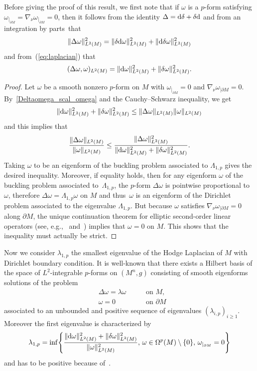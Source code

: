 \documentclass[pdftex]{sigma}
\numberwithin{equation}{section}
\theoremstyle{definition}
\begin{document}
Before giving the proof of this result, we first note that if $\omega$ is a $p$-form satisfying $\omega_{|_{\partial M}}=\nabla_\nu \omega_{|_{\partial M}}=0$, then it follows from the identity $\Delta={\rm d}\delta+\delta {\rm d}$ and from an integration by parts~that
\[%
\|\Delta \omega \|^2_{L^2(M)} = \|\delta {\rm d}\omega \|^2_{L^2( M)}+\|{\rm d}\delta\omega \|^2_{L^2(M)}
\]
and from~(\ref{eq:laplacian}) that
\begin{equation}\label{Deltaomega_scal_omega}
(\Delta \omega,\omega)_{L^2( M)} = \|{\rm d}\omega \|^2_{L^2( M)}+\|\delta\omega \|^2_{L^2(M)}.
\end{equation}

\begin{proof} Let $\omega$ be a smooth nonzero $p$-form on $M$ with $\omega_{|_{\partial M}}=0$ and $\nabla_\nu\omega_{|\partial M}=0$. By~\eqref{Deltaomega_scal_omega} and the Cauchy--Schwarz inequality, we get
\[
\|{\rm d}\omega \|^2_{L^2( M)}+\|\delta\omega \|^2_{L^2( M)}\leq\| \Delta \omega\|_{L^2( M)} \| \omega\|_{L^2( M)}
\]
and this implies that
\[
\frac{\| \Delta \omega\|_{L^2( M)}}{\|\omega\|_{L^2(M)}}\leq\frac{\| \Delta \omega\|_{L^2( M)}^2}{\|{\rm d}\omega \|^2_{L^2( M)}+\|\delta\omega \|^2_{L^2( M)}}.
\]
Taking $\omega$ to be an eigenform of the buckling problem associated to $\Lambda_{1,p}$ gives the desired inequality. Moreover, if equality holds, then for any eigenform $\omega$ of the buckling problem associated to~$\Lambda_{1,p}$, the $p$-form $\Delta\omega$ is pointwise proportional to $\omega$, therefore $\Delta\omega=\Lambda_{1,p}\omega$ on $M$ and thus~$\omega$ is an eigenform of the Dirichlet problem associated to the eigenvalue $\Lambda_{1,p}$.
But because $\omega$ satisfies $\nabla_\nu\omega_{|\partial M}=0$ along $\partial M$, the unique continuation theorem for elliptic second-order linear operators (see, e.g.,~\cite[Theorem~1.4]{Salolectnotes2014} and~\cite[Chapter~VIII]{HoermanderlinearI}) implies that $\omega=0$ on $M$. This shows that the inequality must actually be strict.
\end{proof}

Now we consider $\lambda_{1,p}$ the smallest eigenvalue of the Hodge Laplacian of $M$ with Dirichlet boundary condition.
It is well-known that there exists a Hilbert basis of the space of $L^2$-integrable $p$-forms on $(M^n,g)$ consisting of smooth eigenforms solutions of the problem
\begin{equation}\label{DirichletBC}
\begin{aligned}
&\Delta \omega =\lambda \omega \ \quad&&\textrm{on } M,\\
&\omega=0\ \quad &&\textrm{on }\partial M
\end{aligned}
\end{equation}
associated to an unbounded and positive sequence of eigenvalues $(\lambda_{i,p})_{i\geq 1}$. Moreover the first eigenvalue is characterized by
\[
\lambda_{1,p}=\inf\Biggl\{\frac{\|{\rm d}\omega\|_{L^2(M)}^2+\|\delta\omega\|_{L^2(M)}^2}{\|\omega\|_{L^2(M)}^2},\, \omega\in\Omega^p(M)\setminus\{0\},\, \omega_{|_{\partial M}}=0\Biggr\}
\]
and has to be positive because of~\cite{Anne89}.
\end{document}
